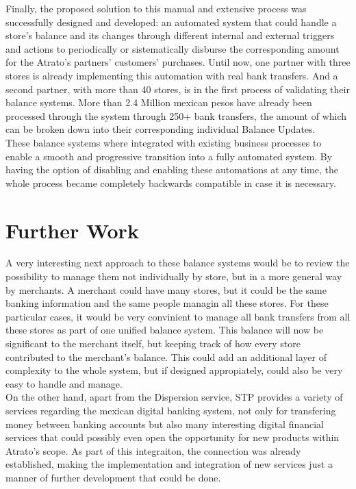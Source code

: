 Finally, the proposed solution to this manual and extensive process was successfully designed and developed: an automated system that could handle a store's balance and its changes through different internal and external triggers and actions to periodically or sistematically disburse the corresponding amount for the Atrato's partners' customers' purchases. Until now, one partner with three stores is already implementing this automation with real bank transfers. And a second partner, with more than 40 stores, is in the first process of validating their balance systems. More than 2.4 Million mexican pesos have already been processed through the system through 250+ bank transfers, the amount of which can be broken down into their corresponding individual Balance Updates.\\

These balance systems where integrated with existing business processes to enable a smooth and progressive transition into a fully automated system. By having the option of disabling and enabling these automations at any time, the whole process became completely backwards compatible in case it is necessary.\\


\section{Further Work}

A very interesting next approach to these balance systems would be to review the possibility to manage them not individually by store, but in a more general way by merchants. A merchant could have many stores, but it could be the same banking information and the same people managin all these stores. For these particular cases, it would be very convinient to manage all bank transfers from all these stores as part of one unified balance system. This balance will now be significant to the merchant itself, but keeping track of how every store contributed to the merchant's balance. This could add an additional layer of complexity to the whole system, but if designed appropiately, could also be very easy to handle and manage.\\ 

On the other hand, apart from the Dispersion service, STP provides a variety of services regarding the mexican digital banking system, not only for transfering money between banking accounts but also many interesting digital financial services that could possibly even open the opportunity for new products within Atrato's scope. As part of this integraiton, the connection was already established, making the implementation and integration of new services just a manner of further development that could be done.\\

